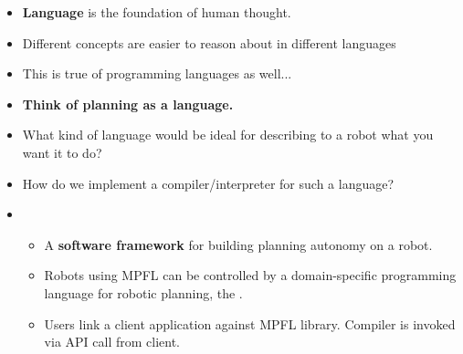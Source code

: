 \documentclass{beamer}
\begin{document}
\begin{frame}
	\begin{itemize}
	\item \textbf{Language} is the foundation of human thought.
	\item Different concepts are easier to reason about in different languages
	\item This is true of programming languages as well...
	\end{itemize}
\end{frame}

\begin{frame}
	\begin{itemize}
	\item \textbf{Think of planning as a language.}
	\item What kind of language would be ideal for describing to a robot what you want it to do?
	\item How do we implement a compiler/interpreter for such a language?
\end{itemize}
\end{frame}

\begin{frame}

	\begin{itemize}
	\item {}
		\begin{itemize}
		\item A \textbf{software framework} for building planning autonomy on a robot.
		\item Robots using MPFL can be controlled by a domain-specific programming language for robotic planning, the .
		\item Users link a client application against MPFL library. Compiler is invoked via API call from client.
		\end{itemize}
	\end{itemize}
\end{frame}

\begin{frame}
\end{frame}
\end{document}
